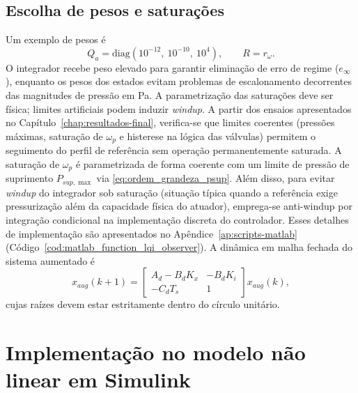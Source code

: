 \subsection{Escolha de pesos e saturações}
Um exemplo de pesos é
\[
    Q_a=\mathrm{diag}(10^{-12},\ 10^{-10},\ 10^{4}),\qquad
    R=r_{\omega}.
\]
O integrador recebe peso elevado para garantir eliminação de erro de regime ($e_\infty$), enquanto os pesos dos estados evitam problemas de escalonamento decorrentes das magnitudes de pressão em Pa. A parametrização das saturações deve ser física; limites artificiais podem induzir \emph{windup}. A partir dos ensaios apresentados no Capítulo~\ref{chap:resultados-final}, verifica-se que limites coerentes (pressões máximas, saturação de $\omega_p$ e histerese na lógica das válvulas) permitem o seguimento do perfil de referência sem operação permanentemente saturada.
A saturação de $\omega_p$ é parametrizada de forma coerente com um limite de pressão de suprimento $P_{sup,\max}$ via \eqref{eq:ordem_grandeza_psup}. Além disso, para evitar \emph{windup} do integrador sob saturação (situação típica quando a referência exige pressurização além da capacidade física do atuador), emprega-se anti-windup por integração condicional na implementação discreta do controlador. Esses detalhes de implementação são apresentados no Apêndice~\ref{ap:scripts-matlab} (Código~\ref{cod:matlab_function_lqi_observer}).
A dinâmica em malha fechada do sistema aumentado é
\[
    x_{aug}(k+1)=
    \begin{bmatrix}
        A_d - B_d K_x & - B_d K_i \\
        -C_d T_s      & 1
    \end{bmatrix}
    x_{aug}(k),
\]
cujas raízes devem estar estritamente dentro do círculo unitário.

\section{Implementação no modelo não linear em Simulink}
\label{sec:implementacao-simulink}
